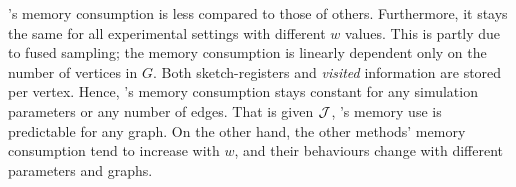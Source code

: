 

\acro{}'s memory consumption is less compared to those of others. Furthermore, it stays the same for all experimental settings with different $w$ values. This is partly due to fused sampling; the memory consumption is linearly dependent only on the number of vertices in $G$. Both sketch-registers and {\em visited} information are stored per vertex. Hence, \acro's memory consumption stays constant for any simulation parameters or any number of edges. That is given ${\cal J}$, \acro's memory use is predictable for any graph. On the other hand, the other methods' memory consumption tend to increase with $w$, and their behaviours change with different parameters and graphs. 

